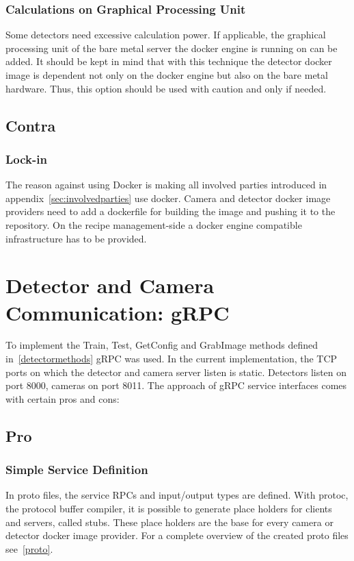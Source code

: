  \subsubsection{Calculations on Graphical Processing Unit}
 Some detectors need excessive calculation power. If applicable, the graphical processing unit of the bare metal server the docker engine is running on can be added. It should be kept in mind that with this technique the detector docker image is dependent not only on the docker engine but also on the bare metal hardware. Thus, this option should be used with caution and only if needed.
\subsection{Contra}
\subsubsection{Lock-in}
The reason against using Docker is making all involved parties introduced in appendix~\ref{sec:involvedparties} use docker. Camera and detector docker image providers need to add a dockerfile for building the image and pushing it to the repository. On the recipe management-side a docker engine compatible infrastructure has to be provided. 

\section{Detector and Camera Communication: gRPC}
To implement the Train, Test, GetConfig and GrabImage methods defined in~\ref{detectormethods} gRPC was used. In the current implementation, the TCP ports on which the detector and camera server listen is static. Detectors listen on port 8000, cameras on port 8011. The approach of gRPC service interfaces comes with certain pros and cons:
\subsection{Pro}
\subsubsection{Simple Service Definition}
In proto files, the service RPCs and input/output types are defined. With protoc, the protocol buffer compiler, it is possible to generate place holders for clients and servers, called stubs. These place holders are the base for every camera or detector docker image provider. For a complete overview of the created proto files see~\ref{proto}. 
